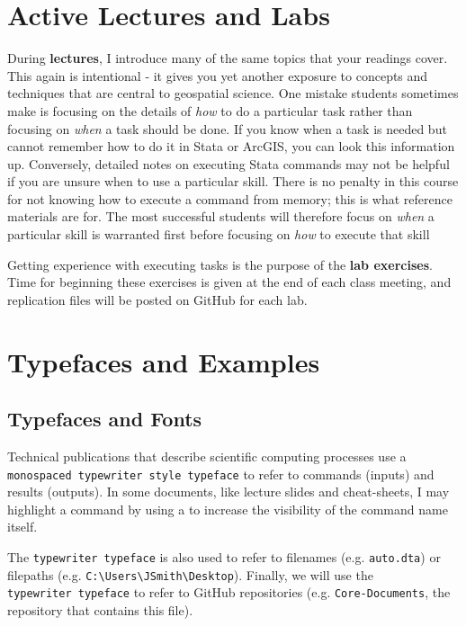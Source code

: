 \documentclass[]{book}
\begin{document}
\section{Active Lectures and Labs}\label{active-lectures-and-labs}

During \textbf{lectures}, I introduce many of the same topics that your
readings cover. This again is intentional - it gives you yet another
exposure to concepts and techniques that are central to geospatial
science. One mistake students sometimes make is focusing on the details
of \emph{how} to do a particular task rather than focusing on
\emph{when} a task should be done. If you know when a task is needed but
cannot remember how to do it in Stata or ArcGIS, you can look this
information up. Conversely, detailed notes on executing Stata commands
may not be helpful if you are unsure when to use a particular skill.
There is no penalty in this course for not knowing how to execute a
command from memory; this is what reference materials are for. The most
successful students will therefore focus on \emph{when} a particular
skill is warranted first before focusing on \emph{how} to execute that
skill

Getting experience with executing tasks is the purpose of the
\textbf{lab exercises}. Time for beginning these exercises is given at
the end of each class meeting, and replication files will be posted on
GitHub for each lab.

\section{Typefaces and Examples}\label{typefaces-and-examples}

\subsection{Typefaces and Fonts}\label{typefaces-and-fonts}

Technical publications that describe scientific computing processes use
a \texttt{monospaced\ typewriter\ style\ typeface} to refer to commands
(inputs) and results (outputs). In some documents, like lecture slides
and cheat-sheets, I may highlight a command by using a to increase the
visibility of the command name itself.

The \texttt{typewriter\ typeface} is also used to refer to filenames
(e.g. \texttt{auto.dta}) or filepaths (e.g.
\texttt{C:\textbackslash{}Users\textbackslash{}JSmith\textbackslash{}Desktop}).
Finally, we will use the \texttt{typewriter\ typeface} to refer to
GitHub repositories (e.g. \texttt{Core-Documents}, the repository that
contains this file).
\end{document}
